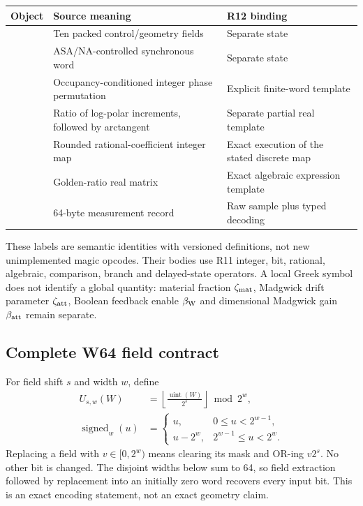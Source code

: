 \begin{center}\small
\begin{tabularx}{\linewidth}{@{}P{32mm}Y Y@{}}
\toprule
Object & Source meaning & R12 binding\\\midrule
{} & Ten packed control/geometry fields & Separate  state\\
 & ASA/NA-controlled synchronous word & Separate  state\\
 & Occupancy-conditioned integer phase permutation & Explicit finite-word template\\
 & Ratio of log-polar increments, followed by arctangent & Separate partial real template\\
 & Rounded rational-coefficient integer map & Exact execution of the stated discrete map\\
 & Golden-ratio real matrix & Exact algebraic expression template\\
 & 64-byte measurement record & Raw  sample plus typed decoding\\
\bottomrule
\end{tabularx}\end{center}
These labels are semantic identities with versioned definitions, not new
unimplemented magic opcodes. Their bodies use R11 integer, bit, rational,
algebraic, comparison, branch and delayed-state operators. A local Greek symbol
does not identify a global quantity: material fraction $\zeta_{\rm mat}$,
Madgwick drift parameter $\zeta_{\rm att}$, Boolean feedback enable
$\beta_{\rm W}$ and dimensional Madgwick gain $\beta_{\rm att}$ remain separate.

\subsection{Complete W64 field contract}
For field shift $s$ and width $w$, define
\begin{align}
 U_{s,w}(W)&=\left\lfloor\frac{\operatorname{uint}(W)}{2^s}\right\rfloor
                         \bmod 2^w,\\
 \operatorname{signed}_w(u)&=
 \begin{cases}u,&0\le u<2^{w-1},\\u-2^w,&2^{w-1}\le u<2^w.\end{cases}
\end{align}
Replacing a field with $v\in[0,2^w)$ means clearing its mask and OR-ing
$v2^s$. No other bit is changed. The disjoint widths below sum to 64, so field
extraction followed by replacement into an initially zero word recovers every
input bit. This is an exact encoding statement, not an exact geometry claim.

